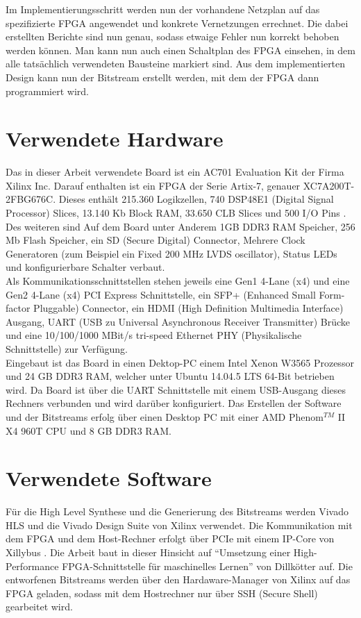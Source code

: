 Im Implementierungsschritt werden nun der vorhandene Netzplan auf das spezifizierte FPGA angewendet und konkrete Vernetzungen errechnet. Die dabei erstellten Berichte sind nun genau, sodass etwaige Fehler nun korrekt behoben werden können. Man kann nun auch einen Schaltplan des FPGA einsehen, in dem alle tatsächlich verwendeten Bausteine markiert sind.
Aus dem implementierten Design kann nun der Bitstream erstellt werden, mit dem der FPGA dann programmiert wird.
\section{Verwendete Hardware}
Das in dieser Arbeit verwendete Board ist ein AC701 Evaluation Kit der Firma Xilinx Inc. Darauf enthalten ist ein FPGA der Serie Artix-7, genauer XC7A200T-2FBG676C. Dieses enthält 215.360 Logikzellen, 740 DSP48E1 (Digital Signal Processor) Slices, 13.140 Kb Block RAM, 33.650 CLB Slices und 500 I/O Pins \cite{XIL3}.
\\Des weiteren sind Auf dem Board unter Anderem 1GB DDR3 RAM Speicher, 256 Mb Flash Speicher, ein SD (Secure Digital) Connector, Mehrere Clock Generatoren (zum Beispiel ein Fixed 200 MHz LVDS oscillator), Status LEDs und konfigurierbare Schalter verbaut.\\
Als Kommunikationsschnittstellen stehen jeweils eine Gen1 4-Lane (x4) und eine Gen2 4-Lane (x4) PCI Express Schnittstelle, ein SFP+ (Enhanced Small Form-factor Pluggable) Connector, ein HDMI (High Definition Multimedia Interface) Ausgang, UART (USB zu Universal Asynchronous Receiver Transmitter) Brücke und eine 10/100/1000 MBit/s tri-speed Ethernet PHY (Physikalische Schnittstelle) zur Verfügung\cite{XIL1}.\\
Eingebaut ist das Board in einen Dektop-PC einem Intel Xenon W3565 Prozessor und 24 GB DDR3 RAM, welcher unter Ubuntu 14.04.5 LTS 64-Bit betrieben wird. Da Board ist über die UART Schnittstelle mit einem USB-Ausgang dieses Rechners verbunden und wird darüber konfiguriert.
Das Erstellen der Software und der Bitstreams erfolg über einen Desktop PC mit einer AMD Phenom$^{TM}$ II X4 960T CPU und 8 GB DDR3 RAM.
\section{Verwendete Software}
Für die High Level Synthese und die Generierung des Bitstreams werden Vivado HLS  und die Vivado Design Suite von Xilinx verwendet. Die Kommunikation mit dem FPGA und dem Host-Rechner erfolgt über PCIe mit einem IP-Core von Xillybus \cite{XILLY}. Die Arbeit baut in dieser Hinsicht auf "`Umsetzung einer High-Performance FPGA-Schnittstelle für maschinelles Lernen"' von Dillkötter\cite{DILL} auf. Die entworfenen Bitstreams werden über den Hardaware-Manager von Xilinx auf das FPGA geladen, sodass mit dem Hostrechner nur über SSH (Secure Shell) gearbeitet wird.
